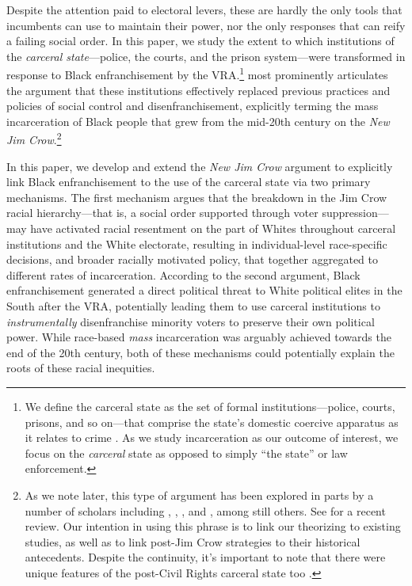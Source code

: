 \documentclass[12pt]{article}
\begin{document}
Despite the attention paid to electoral levers, these are hardly the only tools that incumbents can use to maintain their power, nor the only responses that can reify a failing social order.  In this paper, we study the extent to which institutions of the \emph{carceral state}---police, the courts, and the prison system---were transformed in response to Black enfranchisement by the VRA.\footnote{We define the carceral state as the set of formal institutions---police, courts, prisons, and so on---that comprise the state's domestic coercive apparatus as it relates to crime \citep{Foucault:1977va}.  As we study incarceration as our outcome of interest, we focus on the \emph{carceral} state as opposed to simply ``the state'' or law enforcement.}  \cite{Alexander:2012tj} most prominently articulates the argument that these institutions effectively replaced previous practices and policies of social control and disenfranchisement, explicitly terming the mass incarceration of Black people that grew from the mid-20th century on the \emph{New Jim Crow}.\footnote{As we note later, this type of argument has been explored in parts by a number of scholars including \cite{Weaver:2007vr}, \cite{Hinton:2016tb}, \cite{Murakawa:2014vj}, and \cite{Gottschalk:2006ub}, among still others. See \cite{Beckett:2020cw} for a recent review.  Our intention in using this phrase is to link our theorizing to existing studies, as well as to link post-Jim Crow strategies to their historical antecedents.  Despite the continuity, it's important to note that there were unique features of the post-Civil Rights carceral state too \citep{Lerman:2014wr}. }

In this paper, we develop and extend the \emph{New Jim Crow} argument to explicitly link Black enfranchisement to the use of the carceral state via two primary mechanisms.  The first mechanism argues that the breakdown in the Jim Crow racial hierarchy---that is, a social order supported through voter suppression---may have activated racial resentment on the part of Whites throughout carceral institutions and the White electorate, resulting in individual-level race-specific decisions, and broader racially motivated policy, that together aggregated to different rates of incarceration. According to the second argument, Black enfranchisement generated a direct political threat to White political elites in the South after the VRA, potentially leading them to use carceral institutions to \emph{instrumentally} disenfranchise minority voters to preserve their own political power. While race-based \emph{mass} incarceration was arguably achieved towards the end of the 20th century, both of these mechanisms could potentially explain the roots of these racial inequities.
\end{document}
